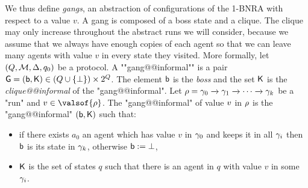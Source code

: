 	We thus define \emph{gangs}, an abstraction of configurations%
	 of the 1-BNRA with respect to a value $v$. A gang is composed of a boss state and a clique. The clique may only increase throughout the abstract runs we will consider, because we assume that we always have enough copies of each agent so that we can leave many agents with value $v$ in every state they visited.
	\AP More formally, let $(Q,\mathcal{M}, \Delta, q_0)$ be a protocol.
	A ""gang@@informal"" is a pair $\mathsf{G} = (\mathsf{b}, \mathsf{K}) \in (Q \cup \{\bot\}) \times 2^{Q}$. The element $\mathsf{b}$ is the \emph{boss} and the set $\mathsf{K}$ is the \emph{clique@@informal} of the "gang@@informal". 	
	Let $\rho = \gamma_0 \xrightarrow{} \gamma_1 \xrightarrow{} \cdots \xrightarrow{} \gamma_k$ be a "run" and $\aval \in \valsof{\run}$. The "gang@@informal" of value $v$ in $\rho$ is the "gang@@informal" $(\mathsf{b}, \mathsf{K})$ such that:
	\begin{itemize}
		\item if there exists $a_0$ an agent which has value $v$ in $\gamma_0$ and keeps it in all $\gamma_i$ then $\mathsf{b}$ is its state in $\gamma_k$, otherwise $\mathsf{b} := \bot$, 
		\item  $\mathsf{K}$ is the set of states $q$ such that there is an agent in $q$ with value $v$ in some $\gamma_i$.
	\end{itemize}
	
  
	


